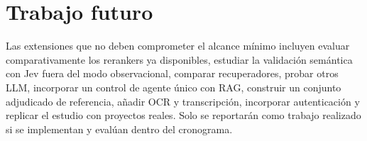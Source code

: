 \section{Trabajo futuro}

Las extensiones que no deben comprometer el alcance mínimo incluyen evaluar comparativamente los rerankers ya disponibles, estudiar la validación semántica con Jev fuera del modo observacional, comparar recuperadores, probar otros LLM, incorporar un control de agente único con RAG, construir un conjunto adjudicado de referencia, añadir OCR y transcripción, incorporar autenticación y replicar el estudio con proyectos reales. Solo se reportarán como trabajo realizado si se implementan y evalúan dentro del cronograma.

